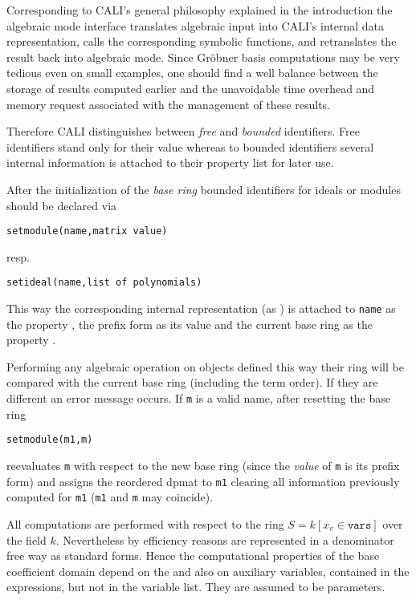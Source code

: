 Corresponding to CALI's general philosophy explained in the
introduction the algebraic mode interface translates algebraic input
into CALI's internal data representation, calls the corresponding
symbolic functions, and retranslates the result back into algebraic
mode. Since Gr\"obner basis computations may be very tedious even on small
examples, one should find a well balance between the storage of
results computed earlier and the unavoidable time overhead and memory
request associated with the management of these results.

Therefore CALI distinguishes between \emph{free} and \emph{bounded}
 identifiers. Free
identifiers stand only for their value whereas to bounded identifiers
several internal information is attached to their property list for
later use.
\medskip

After the initialization of the \emph{base ring} bounded identifiers
for ideals or modules should be declared via
\begin{verbatim}
setmodule(name,matrix value)
\end{verbatim}
resp.
\begin{verbatim}
setideal(name,list of polynomials)
\end{verbatim}
This way the corresponding internal representation (as )
is attached to \texttt{name} as the property , the prefix
form as its value and the current base ring as the property
.

Performing any algebraic operation on objects defined this way their
ring will be compared with the current base ring (including the term
order). If they are different an error message occurs. If \texttt{m} is
a valid name, after resetting the base ring
\begin{verbatim}
setmodule(m1,m)
\end{verbatim}
reevaluates \texttt{m} with respect to the new base ring (since the
\emph{value} of \texttt{m} is its prefix form) and assigns the reordered
dpmat to \texttt{m1} clearing all information previously computed for
\texttt{m1} (\texttt{m1} and \texttt{m} may coincide).

All computations are performed with respect to the ring $S=k[x_v\in
\texttt{vars}]$ over the field $k$. Nevertheless by efficiency reasons
 are represented in a denominator free way as
standard forms. Hence the computational properties of the base
coefficient domain depend on the  and also on auxiliary
variables, contained in the expressions, but not in the variable
list. They are assumed to be parameters. 


